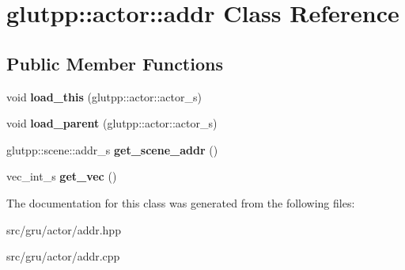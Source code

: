 \hypertarget{classglutpp_1_1actor_1_1addr}{\section{glutpp\-:\-:actor\-:\-:addr \-Class \-Reference}
\label{classglutpp_1_1actor_1_1addr}
}
\subsection*{\-Public \-Member \-Functions}
\begin{DoxyCompactItemize}
\item 
\hypertarget{classglutpp_1_1actor_1_1addr_a4ff0714fce12a46f83ec5a5fc6ab35f5}{void {\bfseries load\-\_\-this} (glutpp\-::actor\-::actor\-\_\-s)}\label{classglutpp_1_1actor_1_1addr_a4ff0714fce12a46f83ec5a5fc6ab35f5}

\item 
\hypertarget{classglutpp_1_1actor_1_1addr_a6feadf708cd212721ef3eb14bea358a5}{void {\bfseries load\-\_\-parent} (glutpp\-::actor\-::actor\-\_\-s)}\label{classglutpp_1_1actor_1_1addr_a6feadf708cd212721ef3eb14bea358a5}

\item 
\hypertarget{classglutpp_1_1actor_1_1addr_a2760e4d141c98e41be5e2ff081ad3631}{glutpp\-::scene\-::addr\-\_\-s {\bfseries get\-\_\-scene\-\_\-addr} ()}\label{classglutpp_1_1actor_1_1addr_a2760e4d141c98e41be5e2ff081ad3631}

\item 
\hypertarget{classglutpp_1_1actor_1_1addr_a2beccb9302141b6f41de0cdabac751d4}{vec\-\_\-int\-\_\-s {\bfseries get\-\_\-vec} ()}\label{classglutpp_1_1actor_1_1addr_a2beccb9302141b6f41de0cdabac751d4}

\end{DoxyCompactItemize}


\-The documentation for this class was generated from the following files\-:\begin{DoxyCompactItemize}
\item 
src/gru/actor/addr.\-hpp\item 
src/gru/actor/addr.\-cpp\end{DoxyCompactItemize}

